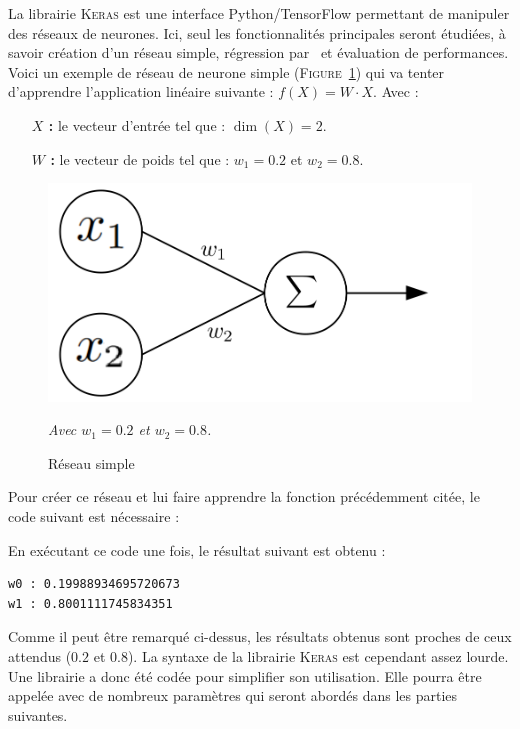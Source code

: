 La librairie \textsc{Keras} est une interface Python/TensorFlow\cite{tf} permettant de manipuler des réseaux de neurones.
Ici, seul les fonctionnalités principales seront étudiées,
à savoir
création d'un réseau simple,
régression par \sgd\
et évaluation de performances.\\


Voici un exemple de réseau de neurone simple (\textsc{Figure}\ \ref{fig:net2})
qui va tenter d'apprendre l'application linéaire suivante : $f(X) = W\cdot X$.
Avec :
\begin{itemize}
    \item[\textbf{$X$ :}] le vecteur d'entrée tel que : $\dim(X) = 2$.
    \item[\textbf{$W$ :}] le vecteur de poids tel que : $w_1 = 0.2$ et $w_2 = 0.8$.
\end{itemize}
\begin{figure}[H]
    \center
    \includegraphics[height=\moyen]{pict/net2.png}
	\caption{Réseau simple}
    \vspace{-10pt}
    \begin{center}
        \footnotesize
        \textit{
        Avec $w_1 = 0.2$ et $w_2 = 0.8$.
        }
    \end{center}
	\label{fig:net2}
\end{figure}
\vspace{-12pt}


Pour créer ce réseau et lui faire apprendre la fonction précédemment citée,
le code suivant est nécessaire :
\newpage



En exécutant ce code une fois, le résultat suivant est obtenu :
\begin{lstlisting}
w0 : 0.19988934695720673
w1 : 0.8001111745834351
\end{lstlisting}

Comme il peut être remarqué ci-dessus, les résultats obtenus sont proches de ceux attendus ($0.2$ et $0.8$).
La syntaxe de la librairie \textsc{Keras} est cependant assez lourde.
Une librairie a donc été codée pour simplifier son utilisation.
Elle pourra être appelée avec de nombreux paramètres qui seront abordés dans les parties suivantes.\\


